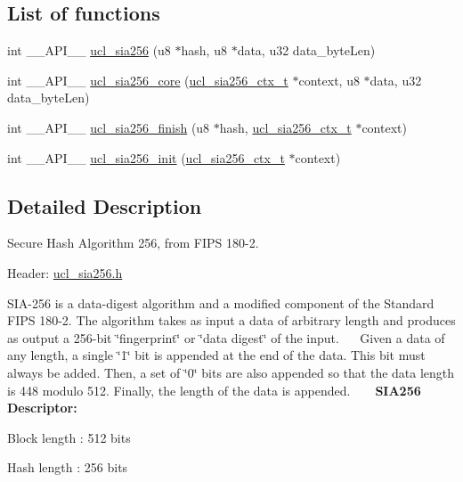 \subsection*{List of functions}
\begin{DoxyCompactItemize}
\item
int \+\_\+\+\_\+\+A\+P\+I\+\_\+\+\_\+ \hyperlink{group___u_c_l___s_i_a256_gad50391bbde94fe6c9f9bdf151f294ac5}{ucl\+\_\+sia256} (u8 $\ast$hash, u8 $\ast$data, u32 data\+\_\+byte\+Len)
\item
int \+\_\+\+\_\+\+A\+P\+I\+\_\+\+\_\+ \hyperlink{group___u_c_l___s_i_a256_ga1a9ce20b83ba89514be822203d40f910}{ucl\+\_\+sia256\+\_\+core} (\hyperlink{group___u_c_l___s_i_a256_ga17e23ec55cac2194659d2b08c2a3f4ca}{ucl\+\_\+sia256\+\_\+ctx\+\_\+t} $\ast$context, u8 $\ast$data, u32 data\+\_\+byte\+Len)
\item
int \+\_\+\+\_\+\+A\+P\+I\+\_\+\+\_\+ \hyperlink{group___u_c_l___s_i_a256_ga6cfa7bc32424e676a7d665470e832242}{ucl\+\_\+sia256\+\_\+finish} (u8 $\ast$hash, \hyperlink{group___u_c_l___s_i_a256_ga17e23ec55cac2194659d2b08c2a3f4ca}{ucl\+\_\+sia256\+\_\+ctx\+\_\+t} $\ast$context)
\item
int \+\_\+\+\_\+\+A\+P\+I\+\_\+\+\_\+ \hyperlink{group___u_c_l___s_i_a256_ga2037616824d3d32416aa642c30499576}{ucl\+\_\+sia256\+\_\+init} (\hyperlink{group___u_c_l___s_i_a256_ga17e23ec55cac2194659d2b08c2a3f4ca}{ucl\+\_\+sia256\+\_\+ctx\+\_\+t} $\ast$context)
\end{DoxyCompactItemize}


\subsection{Detailed Description}
Secure Hash Algorithm 256, from F\+I\+PS 180-\/2.

\begin{DoxyParagraph}{Header\+:}
\hyperlink{ucl__sia256_8h}{ucl\+\_\+sia256.\+h }
\end{DoxyParagraph}
S\+I\+A-\/256 is a data-\/digest algorithm and a modified component of the Standard F\+I\+PS 180-\/2. The algorithm takes as input a data of arbitrary length and produces as output a 256-\/bit \char`\"{}fingerprint\char`\"{} or \char`\"{}data digest\char`\"{} of the input.~\newline
 ~\newline
 Given a data of any length, a single \char`\"{}1\char`\"{} bit is appended at the end of the data. This bit must always be added. Then, a set of \char`\"{}0\char`\"{} bits are also appended so that the data length is 448 modulo 512. Finally, the length of the data is appended. ~\newline
~\newline
 {\bfseries S\+I\+A256 Descriptor\+:} ~\newline
 \begin{DoxyItemize}
\item Block length \+: 512 bits \item Hash length \+: 256 bits \end{DoxyItemize}


